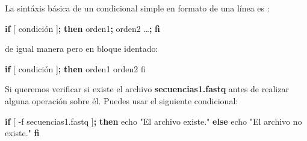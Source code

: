 \documentclass[
  spanish,
  12pt,
  letterpaper,
  DIV=11,
  numbers=noendperiod]{scrreprt}
\newenvironment{Shaded}{\begin{snugshade}}{\end{snugshade}}
\newcommand{\BuiltInTok}[1]{\textcolor[rgb]{0.00,0.23,0.31}{#1}}
\newcommand{\ControlFlowTok}[1]{\textcolor[rgb]{0.00,0.23,0.31}{\textbf{#1}}}
\newcommand{\ExtensionTok}[1]{\textcolor[rgb]{0.00,0.23,0.31}{#1}}
\newcommand{\KeywordTok}[1]{\textcolor[rgb]{0.00,0.23,0.31}{\textbf{#1}}}
\newcommand{\NormalTok}[1]{\textcolor[rgb]{0.00,0.23,0.31}{#1}}
\newcommand{\OtherTok}[1]{\textcolor[rgb]{0.00,0.23,0.31}{#1}}
\newcommand{\StringTok}[1]{\textcolor[rgb]{0.13,0.47,0.30}{#1}}
\begin{document}
La sintáxis básica de un condicional simple en formato de una línea es :

\begin{Shaded}
\begin{Highlighting}[]
\ControlFlowTok{if} \BuiltInTok{[}\NormalTok{ condición }\BuiltInTok{]}\KeywordTok{;} \ControlFlowTok{then} \ExtensionTok{orden1}\KeywordTok{;} \ExtensionTok{orden2}\NormalTok{ …}\KeywordTok{;} \ControlFlowTok{fi}
\end{Highlighting}
\end{Shaded}

de igual manera pero en bloque identado:

\begin{Shaded}
\begin{Highlighting}[]
\ControlFlowTok{if} \BuiltInTok{[}\NormalTok{ condición }\BuiltInTok{]}\KeywordTok{;} \ControlFlowTok{then}      \ExtensionTok{orden1}\NormalTok{     orden2  fi}
\end{Highlighting}
\end{Shaded}

\begin{tcolorbox}[enhanced jigsaw, arc=.35mm, bottomrule=.15mm, bottomtitle=1mm, breakable, colback=white, colbacktitle=quarto-callout-note-color!10!white, colframe=quarto-callout-note-color-frame, coltitle=black, left=2mm, leftrule=.75mm, opacityback=0, opacitybacktitle=0.6, rightrule=.15mm, title={Ejemplo}, titlerule=0mm, toprule=.15mm, toptitle=1mm]

Si queremos verificar si existe el archivo \textbf{secuencias1.fastq}
antes de realizar alguna operación sobre él. Puedes usar el siguiente
condicional:

\end{tcolorbox}

\begin{Shaded}
\begin{Highlighting}[]
\ControlFlowTok{if} \BuiltInTok{[} \OtherTok{{-}f}\NormalTok{ secuencias1.fastq }\BuiltInTok{]}\KeywordTok{;} \ControlFlowTok{then}
  \BuiltInTok{echo} \StringTok{"El archivo existe."}
\ControlFlowTok{else}
  \BuiltInTok{echo} \StringTok{"El archivo no existe."}
\ControlFlowTok{fi}
\end{Highlighting}
\end{Shaded}
\end{document}
